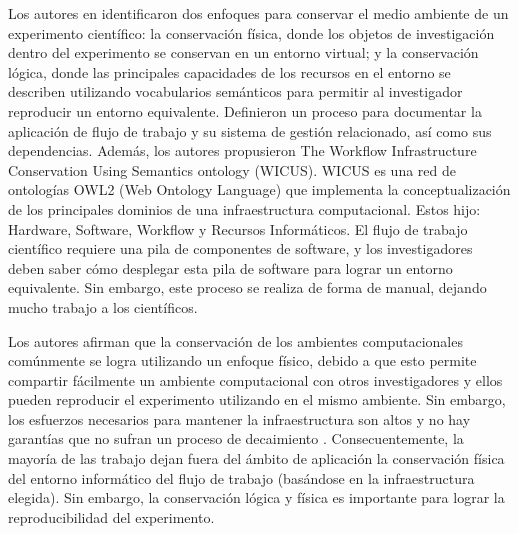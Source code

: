 Los autores en \cite{santana2017reproducibility} identificaron dos enfoques para conservar el medio ambiente de un experimento científico: la conservación física, donde los objetos de investigación dentro del experimento se conservan en un entorno virtual; y la conservación lógica, donde las principales capacidades de los recursos en el entorno se describen utilizando vocabularios semánticos para permitir al investigador reproducir un entorno equivalente. Definieron un proceso para documentar la aplicación de flujo de trabajo y su sistema de gestión relacionado, así como sus dependencias. Además, los autores propusieron The Workflow Infrastructure Conservation Using Semantics ontology (WICUS). WICUS es una red de ontologías OWL2 (Web Ontology Language) que implementa la conceptualización de los principales dominios de una infraestructura computacional. Estos hijo: Hardware, Software, Workflow y Recursos Informáticos. El flujo de trabajo científico requiere una pila de componentes de software, y los investigadores deben saber cómo desplegar esta pila de software para lograr un entorno equivalente.
Sin embargo, este proceso se realiza de forma de manual, dejando mucho trabajo a los científicos. 

Los autores afirman que la conservación de los ambientes computacionales comúnmente se logra utilizando un enfoque físico, debido a que esto permite compartir fácilmente un ambiente computacional con otros investigadores y ellos pueden reproducir el experimento utilizando en el mismo ambiente. 
Sin embargo, los esfuerzos necesarios para mantener la infraestructura son altos y no hay garantías que no sufran un proceso de decaimiento \cite{DBLP:journals/fgcs/DeelmanVJRCMMCS15}.  
Consecuentemente, la mayoría de las trabajo dejan fuera del ámbito de aplicación la conservación física del entorno informático del flujo de trabajo (basándose en la infraestructura elegida). Sin embargo, la conservación lógica y física es importante para lograr la reproducibilidad del experimento. 

